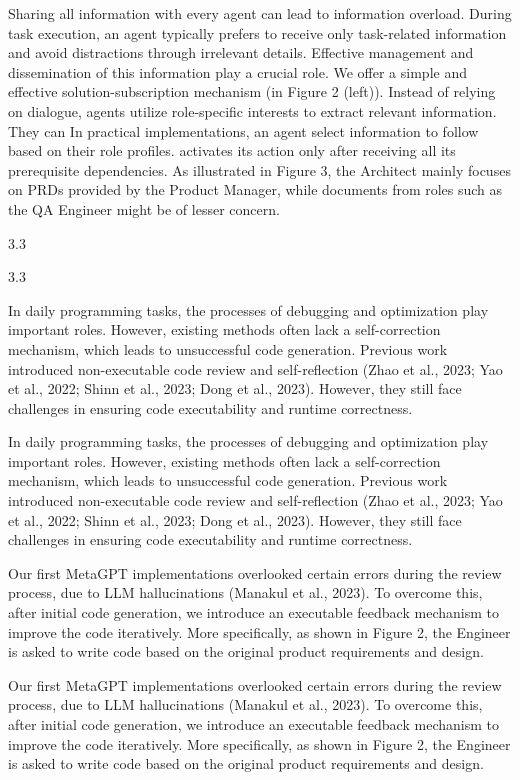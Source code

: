 \documentclass[12pt]{article}
\begin{document}
Sharing all information with every agent can lead to information overload. During task execution,
an agent typically prefers to receive only task-related information and avoid distractions through
irrelevant details. Effective management and dissemination of this information play a crucial role.
We offer a simple and effective solution-subscription mechanism (in Figure 2 (left)). Instead of
relying on dialogue, agents utilize role-specific interests to extract relevant information. They can
In practical implementations, an agent
select information to follow based on their role profiles.
activates its action only after receiving all its prerequisite dependencies. As illustrated in Figure 3,
the Architect mainly focuses on PRDs provided by the Product Manager, while documents from
roles such as the QA Engineer might be of lesser concern.


3.3


3.3


In daily programming tasks, the processes of debugging and optimization play important roles.
However, existing methods often lack a self-correction mechanism, which leads to unsuccessful code
generation. Previous work introduced non-executable code review and self-reflection (Zhao et al.,
2023; Yao et al., 2022; Shinn et al., 2023; Dong et al., 2023). However, they still face challenges in
ensuring code executability and runtime correctness.


In daily programming tasks, the processes of debugging and optimization play important roles.
However, existing methods often lack a self-correction mechanism, which leads to unsuccessful code
generation. Previous work introduced non-executable code review and self-reflection (Zhao et al.,
2023; Yao et al., 2022; Shinn et al., 2023; Dong et al., 2023). However, they still face challenges in
ensuring code executability and runtime correctness.


Our first MetaGPT implementations overlooked certain errors during the review process, due to
LLM hallucinations (Manakul et al., 2023). To overcome this, after initial code generation, we
introduce an executable feedback mechanism to improve the code iteratively. More specifically, as
shown in Figure 2, the Engineer is asked to write code based on the original product requirements
and design.


Our first MetaGPT implementations overlooked certain errors during the review process, due to
LLM hallucinations (Manakul et al., 2023). To overcome this, after initial code generation, we
introduce an executable feedback mechanism to improve the code iteratively. More specifically, as
shown in Figure 2, the Engineer is asked to write code based on the original product requirements
and design.
\end{document}
